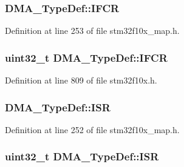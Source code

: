 \subsubsection[{\texorpdfstring{I\+F\+CR}{IFCR}}]{ D\+M\+A\+\_\+\+Type\+Def\+::\+I\+F\+CR}\hypertarget{struct_d_m_a___type_def_a836f5a978e515ab3dc3f975f36aa7824}{}\label{struct_d_m_a___type_def_a836f5a978e515ab3dc3f975f36aa7824}


Definition at line 253 of file stm32f10x\+\_\+map.\+h.

\subsubsection[{\texorpdfstring{I\+F\+CR}{IFCR}}]{ {\bf uint32\+\_\+t} D\+M\+A\+\_\+\+Type\+Def\+::\+I\+F\+CR}\hypertarget{struct_d_m_a___type_def_a30576220ca1968e61666d92092e8911e}{}\label{struct_d_m_a___type_def_a30576220ca1968e61666d92092e8911e}


Definition at line 809 of file stm32f10x.\+h.

\subsubsection[{\texorpdfstring{I\+SR}{ISR}}]{ D\+M\+A\+\_\+\+Type\+Def\+::\+I\+SR}\hypertarget{struct_d_m_a___type_def_a2ea3ae3917ec07762fc81de349981c85}{}\label{struct_d_m_a___type_def_a2ea3ae3917ec07762fc81de349981c85}


Definition at line 252 of file stm32f10x\+\_\+map.\+h.

\subsubsection[{\texorpdfstring{I\+SR}{ISR}}]{ {\bf uint32\+\_\+t} D\+M\+A\+\_\+\+Type\+Def\+::\+I\+SR}\hypertarget{struct_d_m_a___type_def_aa341a859df2f59bf6c0f7a000ab8734b}{}\label{struct_d_m_a___type_def_aa341a859df2f59bf6c0f7a000ab8734b}


